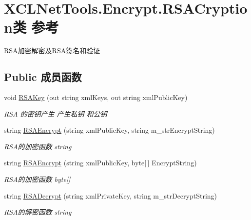 \hypertarget{class_x_c_l_net_tools_1_1_encrypt_1_1_r_s_a_cryption}{}\section{X\+C\+L\+Net\+Tools.\+Encrypt.\+R\+S\+A\+Cryption类 参考}
\label{class_x_c_l_net_tools_1_1_encrypt_1_1_r_s_a_cryption}


R\+S\+A加密解密及\+R\+S\+A签名和验证  


\subsection*{Public 成员函数}
\begin{DoxyCompactItemize}
\item 
void \hyperlink{class_x_c_l_net_tools_1_1_encrypt_1_1_r_s_a_cryption_ac91142d16f1762747461af4491bbd76d}{R\+S\+A\+Key} (out string xml\+Keys, out string xml\+Public\+Key)
\begin{DoxyCompactList}\small\item\em R\+SA 的密钥产生 产生私钥 和公钥 \end{DoxyCompactList}\item 
string \hyperlink{class_x_c_l_net_tools_1_1_encrypt_1_1_r_s_a_cryption_a15ae7532ba367753f784e08a153ea79b}{R\+S\+A\+Encrypt} (string xml\+Public\+Key, string m\+\_\+str\+Encrypt\+String)
\begin{DoxyCompactList}\small\item\em R\+S\+A的加密函数 string \end{DoxyCompactList}\item 
string \hyperlink{class_x_c_l_net_tools_1_1_encrypt_1_1_r_s_a_cryption_a3c6604c439e1ff1aa07d2d5724157b19}{R\+S\+A\+Encrypt} (string xml\+Public\+Key, byte\mbox{[}$\,$\mbox{]} Encrypt\+String)
\begin{DoxyCompactList}\small\item\em R\+S\+A的加密函数 byte\mbox{[}\mbox{]} \end{DoxyCompactList}\item 
string \hyperlink{class_x_c_l_net_tools_1_1_encrypt_1_1_r_s_a_cryption_a5daa894b5020479ee2af68fe3fe75a41}{R\+S\+A\+Decrypt} (string xml\+Private\+Key, string m\+\_\+str\+Decrypt\+String)
\begin{DoxyCompactList}\small\item\em R\+S\+A的解密函数 string \end{DoxyCompactList}\item 

\end{DoxyCompactItemize}
